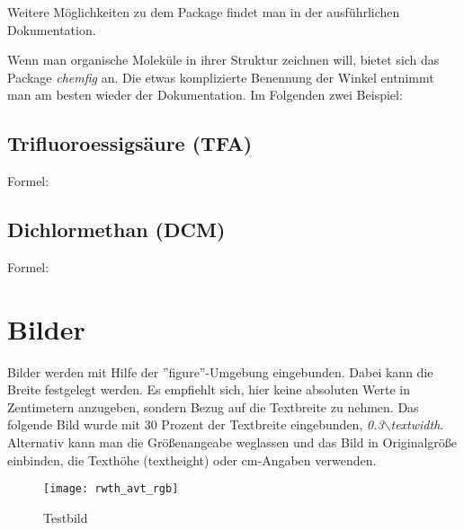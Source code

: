 	Weitere Möglichkeiten zu dem Package findet man in der ausführlichen Dokumentation.
	
	Wenn man organische Moleküle in ihrer Struktur zeichnen will, bietet sich das Package \emph{chemfig} an. Die etwas komplizierte Benennung der Winkel entnimmt man am besten wieder der Dokumentation. Im Folgenden zwei Beispiel:
	\subsection{Trifluoroessigsäure (TFA)}
		
			Formel:\quad {}
			\hspace*{3em}
			\hspace*{3em}
			\\[2ex]
			
		\subsection{Dichlormethan (DCM)}
			
			Formel:\quad {} 
			\hspace*{5em}
			\\[2ex]
			

\section{Bilder}

Bilder werden mit Hilfe der ''figure''-Umgebung eingebunden. Dabei
kann die Breite festgelegt werden. Es empfiehlt sich, hier keine
absoluten Werte in Zentimetern anzugeben, sondern Bezug auf die
Textbreite zu nehmen. Das folgende Bild wurde mit 30 Prozent der
Textbreite eingebunden, \emph{0.3$\backslash$textwidth}. Alternativ kann man die Größenangeabe weglassen und das Bild in Originalgröße einbinden, die Texthöhe (textheight) oder cm-Angaben verwenden.


	\begin{figure}[h!bt]	%
		\begin{center}
		  \texttt{[image: rwth\_avt\_rgb]}
		  \caption{Testbild}\label{fig:Testbild}
		\end{center}
	\end{figure}

